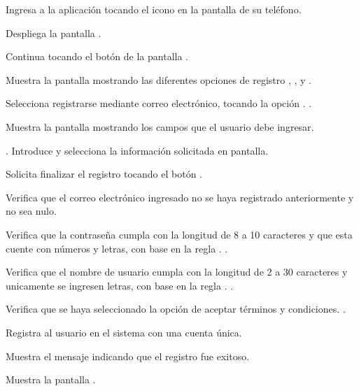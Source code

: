 	\begin{UCtrayectoria}
		\UCpaso [\UCactor] Ingresa a la aplicación tocando el icono  en la pantalla de su teléfono.
		
		\UCpaso Despliega la pantalla  .
		
		\UCpaso [\UCactor] Continua tocando el  botón  de la pantalla .
		
		\UCpaso Muestra la pantalla  mostrando las diferentes opciones de registro , ,  y .
		
		\UCpaso [\UCactor] Selecciona registrarse mediante correo electrónico, tocando la opción .  .
		
		\UCpaso Muestra la pantalla  mostrando los campos que el usuario debe ingresar.
		
		\UCpaso [\UCactor] \label{RE-CU1:IntroduceInformacion}. Introduce y selecciona la información solicitada en pantalla.
		
		\UCpaso [\UCactor] Solicita finalizar el registro tocando el botón .
		
		\UCpaso Verifica que el correo electrónico ingresado no se haya registrado anteriormente y no sea nulo.  
		
		\UCpaso Verifica que la contraseña cumpla con la longitud de 8 a 10 caracteres y que esta cuente con números y letras, con base en la regla .  .
			
		\UCpaso Verifica que el nombre de usuario cumpla con la longitud de 2 a 30 caracteres y unicamente se ingresen letras, con base en la regla .  .
		
		\UCpaso Verifica que se haya seleccionado la opción de aceptar términos y condiciones.  .
		
		\UCpaso Registra al usuario en el sistema con una cuenta única. 
		
		\UCpaso Muestra el mensaje  indicando que el registro fue exitoso.
		
		\UCpaso \label{RE-CU1:Pantalla}Muestra la pantalla .
		
	\end{UCtrayectoria}

